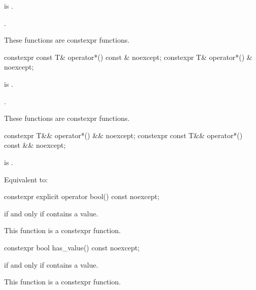 \begin{itemdescr}
\pnum
\hardexpects
{} is .

\pnum
\returns
{}.

\pnum
\remarks
These functions are constexpr functions.
\end{itemdescr}

%
\begin{itemdecl}
constexpr const T& operator*() const & noexcept;
constexpr T& operator*() & noexcept;
\end{itemdecl}

\begin{itemdescr}
\pnum
\hardexpects
{} is .

\pnum
\returns
{}.

\pnum
\remarks
These functions are constexpr functions.
\end{itemdescr}

%
\begin{itemdecl}
constexpr T&& operator*() && noexcept;
constexpr const T&& operator*() const && noexcept;
\end{itemdecl}

\begin{itemdescr}
\pnum
\hardexpects
{} is .

\pnum
\effects
Equivalent to: 
\end{itemdescr}

%
\begin{itemdecl}
constexpr explicit operator bool() const noexcept;
\end{itemdecl}

\begin{itemdescr}
\pnum
\returns
{} if and only if  contains a value.

\pnum
\remarks
This function is a constexpr function.
\end{itemdescr}

%
\begin{itemdecl}
constexpr bool has_value() const noexcept;
\end{itemdecl}

\begin{itemdescr}
\pnum
\returns
{} if and only if  contains a value.

\pnum
\remarks
This function is a constexpr function.
\end{itemdescr}

